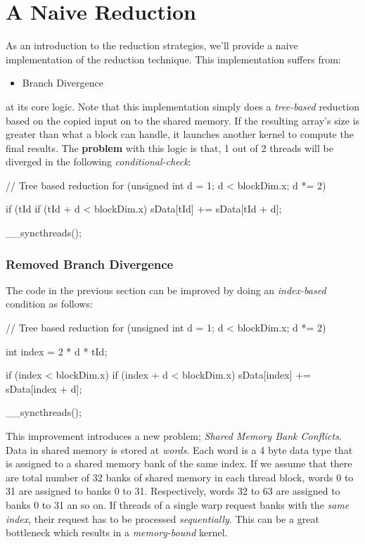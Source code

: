 \documentclass[12pt]{article}
\numberwithin{equation}{section}
\numberwithin{table}{section}
\numberwithin{figure}{section}
\begin{document}
\section{A Naive Reduction}
As an introduction to the reduction strategies, we'll provide a naive implementation of the reduction technique. This implementation suffers from:
\begin{itemize}
	\item Branch Divergence
\end{itemize}
at its core logic. Note that this implementation simply does a \textit{tree-based} reduction based on the copied input on to the shared memory. If the resulting array's size is greater than what a block can handle, it launches another kernel to compute the final results. The \textbf{problem} with this logic is that, 1 out of 2 threads will be diverged in the following \textit{conditional-check}:
\begin{cpp}
	// Tree based reduction
	for (unsigned int d = 1; d < blockDim.x; d *= 2) {
		if (tId %
			if (tId + d < blockDim.x)
				sData[tId] += sData[tId + d];
		
		__syncthreads();
	}
\end{cpp}
\subsubsection*{Removed Branch Divergence}
The code in the previous section can be improved by doing an \textit{index-based} condition as follows:
\begin{cpp}
	// Tree based reduction
	for (unsigned int d = 1; d < blockDim.x; d *= 2) {
		int index = 2 * d * tId;
		
		if (index < blockDim.x)
			if (index + d < blockDim.x)
				sData[index] += sData[index + d];
		
		__syncthreads();
	}
\end{cpp}
This improvement introduces a new problem; \textit{Shared Memory Bank Conflicts}. Data in shared memory is stored at \textit{words}. Each word is a 4 byte data type that is assigned to a shared memory bank of the same index. If we assume that there are total number of 32 banks of shared memory in each thread block, words 0 to 31 are assigned to banks 0 to 31. Respectively, words 32 to 63 are assigned to banks 0 to 31 an so on. If threads of a single warp request banks with the \textit{same index}, their request has to be processed \textit{sequentially}. This can be a great bottleneck which results in a \textit{memory-bound} kernel.
\end{document}
